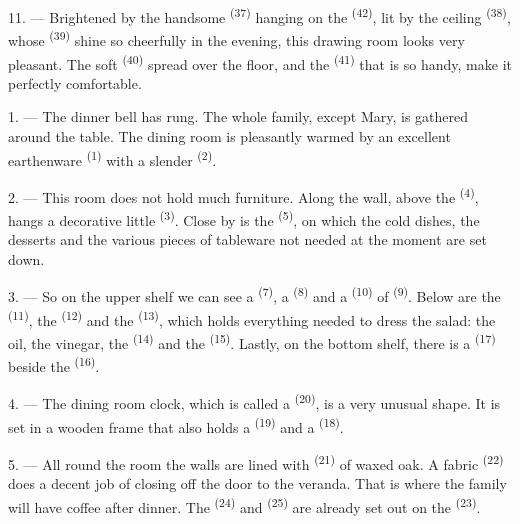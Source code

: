 11. --- Brightened by the handsome  \textsuperscript{(37)} hanging on the
 \textsuperscript{(42)}, lit by the ceiling
 \textsuperscript{(38)}, whose 
\textsuperscript{(39)} shine so cheerfully in the evening, this drawing room looks very
pleasant. The soft  \textsuperscript{(40)} spread over the floor, and the
 \textsuperscript{(41)} that is so handy, make it perfectly comfortable.

\VUsaut{3.6mm}
\VUsaut{3.0mm}

1. --- The dinner bell has rung. The whole family, except Mary, is gathered around the table.
The dining room is pleasantly warmed by an excellent earthenware 
\textsuperscript{(1)} with a slender
 \textsuperscript{(2)}.

2. --- This room does not hold much furniture. Along the wall, above the
 \textsuperscript{(4)}, hangs a decorative little 
\textsuperscript{(3)}. Close by is the  \textsuperscript{(5)}, on which the
cold dishes, the desserts and the various pieces of tableware not needed at the moment are set
down.

3. --- So on the upper shelf we can see a  \textsuperscript{(7)}, a
 \textsuperscript{(8)} and a  \textsuperscript{(10)} of
 \textsuperscript{(9)}. Below are the
 \textsuperscript{(11)}, the  \textsuperscript{(12)} and the
 \textsuperscript{(13)}, which holds everything needed to dress
the salad: the oil, the vinegar, the  \textsuperscript{(14)} and the
 \textsuperscript{(15)}. Lastly, on the bottom shelf, there is a
 \textsuperscript{(17)} beside the  \textsuperscript{(16)}.

4. --- The dining room clock, which is called a  \textsuperscript{(20)}, is
a very unusual shape. It is set in a wooden frame that also holds a 
\textsuperscript{(19)} and a  \textsuperscript{(18)}.

\VUsaut{4.6mm}
\VUsaut{3.0mm}

5. --- All round the room the walls are lined with 
\textsuperscript{(21)} of waxed oak. A fabric  \textsuperscript{(22)}
does a decent job of closing off the door to the veranda. That is where the family will have
coffee after dinner. The  \textsuperscript{(24)} and 
\textsuperscript{(25)} are already set out on the 
\textsuperscript{(23)}.

